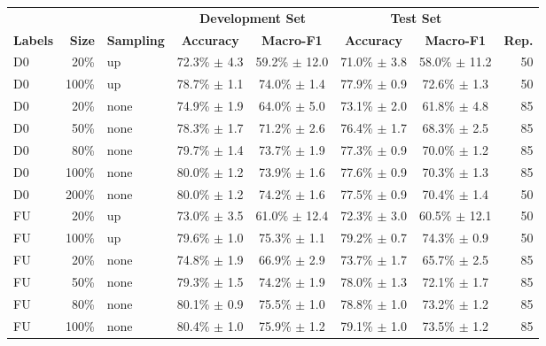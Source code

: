 
\begin{table*}[ht]
\centering
\begin{tabular}{lrlccccr}
&  &  & \multicolumn{2}{c}{\textbf{Development Set}} & \multicolumn{2}{c}{\textbf{Test Set}} \\
\textbf{Labels} & \textbf{Size} & \textbf{Sampling} & \textbf{Accuracy} & \textbf{Macro-F1} & \textbf{Accuracy} & \textbf{Macro-F1} & \textbf{Rep.} \\
\hline
D0  &   20\%  &  up  &   72.3\% $\pm$    4.3  &   59.2\% $\pm$   12.0  &   71.0\% $\pm$    3.8  &   58.0\% $\pm$   11.2  & 50  \\
D0  &   100\%  &  up  &   78.7\% $\pm$    1.1  &   74.0\% $\pm$    1.4  &   77.9\% $\pm$    0.9  &   72.6\% $\pm$    1.3  & 50  \\
\hline
D0  &   20\%  &  none  &   74.9\% $\pm$    1.9  &   64.0\% $\pm$    5.0  &   73.1\% $\pm$    2.0  &   61.8\% $\pm$    4.8  & 85  \\
D0  &   50\%  &  none  &   78.3\% $\pm$    1.7  &   71.2\% $\pm$    2.6  &   76.4\% $\pm$    1.7  &   68.3\% $\pm$    2.5  & 85  \\
D0  &   80\%  &  none  &   79.7\% $\pm$    1.4  &   73.7\% $\pm$    1.9  &   77.3\% $\pm$    0.9  &   70.0\% $\pm$    1.2  & 85  \\
D0  &   100\%  &  none  &   80.0\% $\pm$    1.2  &   73.9\% $\pm$    1.6  &   77.6\% $\pm$    0.9  &   70.3\% $\pm$    1.3  & 85  \\
D0  &   200\%  &  none  &   80.0\% $\pm$    1.2  &   74.2\% $\pm$    1.6  &   77.5\% $\pm$    0.9  &   70.4\% $\pm$    1.4  & 50  \\
\hline
FU  &   20\%  &  up  &   73.0\% $\pm$    3.5  &   61.0\% $\pm$   12.4  &   72.3\% $\pm$    3.0  &   60.5\% $\pm$   12.1  & 50  \\
FU  &   100\%  &  up  &   79.6\% $\pm$    1.0  &   75.3\% $\pm$    1.1  &   79.2\% $\pm$    0.7  &   74.3\% $\pm$    0.9  & 50  \\
\hline
FU  &   20\%  &  none  &   74.8\% $\pm$    1.9  &   66.9\% $\pm$    2.9  &   73.7\% $\pm$    1.7  &   65.7\% $\pm$    2.5  & 85  \\
FU  &   50\%  &  none  &   79.3\% $\pm$    1.5  &   74.2\% $\pm$    1.9  &   78.0\% $\pm$    1.3  &   72.1\% $\pm$    1.7  & 85  \\
FU  &   80\%  &  none  &   80.1\% $\pm$    0.9  &   75.5\% $\pm$    1.0  &   78.8\% $\pm$    1.0  &   73.2\% $\pm$    1.2  & 85  \\
FU  &   100\%  &  none  &   80.4\% $\pm$    1.0  &   75.9\% $\pm$    1.2  &   79.1\% $\pm$    1.0  &   73.5\% $\pm$    1.2  & 85  \\

\end{tabular}
\end{table*}
